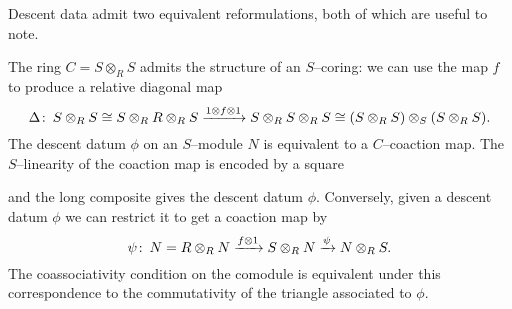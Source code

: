 Descent data admit two equivalent reformulations, both of which are useful to note.
\begin{remark}
The ring \(C = S \otimes_R S\) admits the structure of an \(S\)--coring: we can use the map \(f\) to produce a relative diagonal map \[\Delta\colon\thinspace S \otimes_R S \cong S \otimes_R R \otimes_R S \xrightarrow{1 \otimes f \otimes 1} S \otimes_R S \otimes_R S \cong (S \otimes_R S) \otimes_S (S \otimes_R S).\]  The descent datum \(\phi\) on an \(S\)--module \(N\) is equivalent to a \(C\)--coaction map.  The \(S\)--linearity of the coaction map is encoded by a square
\begin{center}
\end{center}
and the long composite gives the descent datum \(\phi\).  Conversely, given a descent datum \(\phi\) we can restrict it to get a coaction map by \[\psi\colon\thinspace N = R \otimes_R N \xrightarrow{f \otimes 1} S \otimes_R N \xrightarrow{\psi} N \otimes_R S.\]  The coassociativity condition on the comodule is equivalent under this correspondence to the commutativity of the triangle associated to \(\phi\).
\end{remark}

